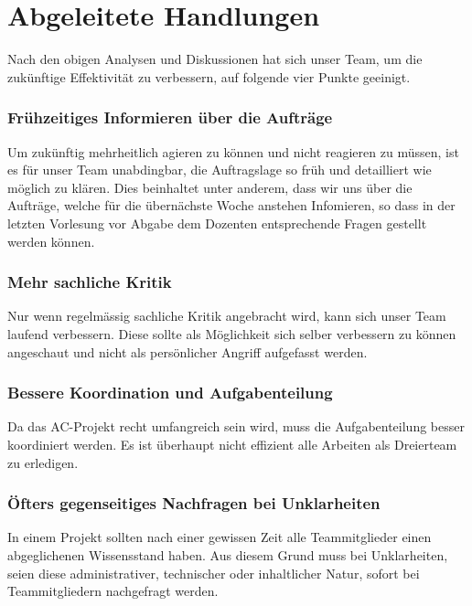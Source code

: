 
\chapter{Abgeleitete Handlungen}

Nach den obigen Analysen und Diskussionen hat sich unser Team, um die zukünftige Effektivität zu verbessern, auf folgende vier Punkte geeinigt.  

\subsection*{Frühzeitiges Informieren über die Aufträge}

Um zukünftig mehrheitlich agieren zu können und nicht reagieren zu müssen, ist es für unser Team unabdingbar, die Auftragslage so früh und detailliert wie möglich zu klären. Dies beinhaltet unter anderem, dass wir uns über die Aufträge, welche für die übernächste Woche anstehen Infomieren, so dass in der letzten Vorlesung vor Abgabe dem Dozenten entsprechende Fragen gestellt werden können. 

\subsection*{Mehr sachliche Kritik}  

Nur wenn regelmässig sachliche Kritik angebracht wird, kann sich unser Team laufend verbessern. Diese sollte als Möglichkeit sich selber verbessern zu können angeschaut und nicht als persönlicher Angriff aufgefasst werden. 

\subsection*{Bessere Koordination und Aufgabenteilung}

Da das AC-Projekt recht umfangreich sein wird, muss die Aufgabenteilung besser koordiniert werden. Es ist überhaupt nicht effizient alle Arbeiten als Dreierteam zu erledigen. 

\subsection*{Öfters gegenseitiges Nachfragen bei Unklarheiten}

In einem Projekt sollten nach einer gewissen Zeit alle Teammitglieder einen abgeglichenen Wissensstand haben. Aus diesem Grund muss bei Unklarheiten, seien diese administrativer, technischer oder inhaltlicher Natur, sofort bei Teammitgliedern nachgefragt werden.


\nocite{lencioni2010five}